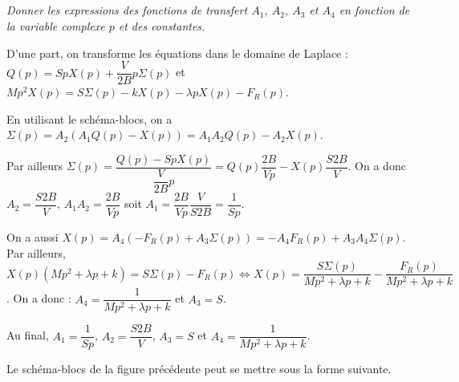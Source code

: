 \documentclass[10pt,fleqn]{article} %
\begin{document}
\begin{multicols}{2}
\fi
\subparagraph{}
\textit{Donner les expressions des fonctions de transfert $A_1$, $A_2$, $A_3$ et $A_4$ en fonction de la variable
complexe $p$ et des constantes.}
\ifprof
\begin{corrige}
D'une part, on transforme les équations dans le domaine de Laplace : 
$Q(p)=S p X(p)+\dfrac{V}{2B} p \Sigma(p)$ et
$Mp^2 X(p) = S \Sigma(p) - kX(p)-\lambda p X(p) - F_R(p)$.

En utilisant le schéma-blocs, on a $\Sigma(p)=A_2\left(A_1Q(p)-X(p)\right) = A_1A_2Q(p)-A_2X(p)$.

Par ailleurs $\Sigma(p)=\dfrac{Q(p)-S p X(p)}{\dfrac{V}{2B} p}= Q(p)\dfrac{2B}{Vp}-  X(p)  \dfrac{S2B}{V} $. On a donc $A_2 = \dfrac{S2B}{V} $, $A_1 A_2 = \dfrac{2B}{Vp}$ soit $A_1  = \dfrac{2B}{Vp}\dfrac{V}{S2B}= \dfrac{1}{Sp}$. 


On a aussi $X(p)=A_4\left(-F_R(p)+A_3\Sigma(p)\right) =-A_4F_R(p)+A_3A_4\Sigma(p)$. Par ailleurs,
$X(p) \left(Mp^2  +\lambda p  + k\right)= S \Sigma(p) - F_R(p) \Leftrightarrow X(p) =  \dfrac{S \Sigma(p)}{Mp^2  +\lambda p  + k}-\dfrac{F_R(p)}{Mp^2  +\lambda p  + k}$. On a donc : $A_4 = \dfrac{1}{Mp^2  +\lambda p  + k}$ et $A_3 = S$.

Au final,  $A_1=\dfrac{1}{Sp}$,  $A_2 = \dfrac{S2B}{V} $,  $A_3 = S$  et $A_4 = \dfrac{1}{Mp^2  +\lambda p  + k}$.
\end{corrige}
\else
\fi

\ifprof
\else

Le schéma-blocs de la figure précédente peut se mettre sous la forme suivante. 

\footnotesize
\begin{center}
\end{center}
\normalsize


\end{multicols}
\end{document}
